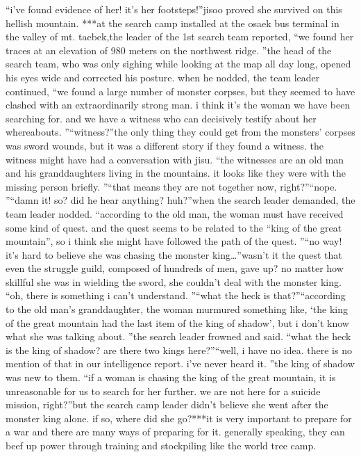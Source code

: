 “i’ve found evidence of her! it’s her footsteps!”jisoo proved she survived on this hellish mountain.
***at the search camp installed at the osaek bus terminal in the valley of mt.
 taebek,the leader of the 1st search team reported, “we found her traces at an elevation of 980 meters on the northwest ridge.
”the head of the search team, who was only sighing while looking at the map all day long, opened his eyes wide and corrected his posture.
when he nodded, the team leader continued, “we found a large number of monster corpses, but they seemed to have clashed with an extraordinarily strong man.
 i think it’s the woman we have been searching for.
 and we have a witness who can decisively testify about her whereabouts.
”“witness?”the only thing they could get from the monsters’ corpses was sword wounds, but it was a different story if they found a witness.
 the witness might have had a conversation with jisu.
“the witnesses are an old man and his granddaughters living in the mountains.
 it looks like they were with the missing person briefly.
”“that means they are not together now, right?”“nope.
”“damn it! so? did he hear anything? huh?”when the search leader demanded, the team leader nodded.
“according to the old man, the woman must have received some kind of quest.
 and the quest seems to be related to the “king of the great mountain”, so i think she might have followed the path of the quest.
”“no way! it’s hard to believe she was chasing the monster king…”wasn’t it the quest that even the struggle guild, composed of hundreds of men, gave up? no matter how skillful she was in wielding the sword, she couldn’t deal with the monster king.
“oh, there is something i can’t understand.
”“what the heck is that?”“according to the old man’s granddaughter, the woman murmured something like, ‘the king of the great mountain had the last item of the king of shadow’, but i don’t know what she was talking about.
”the search leader frowned and said.
 “what the heck is the king of shadow? are there two kings here?”“well, i have no idea.
 there is no mention of that in our intelligence report.
 i’ve never heard it.
”the king of shadow was new to them.
“if a woman is chasing the king of the great mountain, it is unreasonable for us to search for her further.
 we are not here for a suicide mission, right?”but the search camp leader didn’t believe she went after the monster king alone.
if so, where did she go?***it is very important to prepare for a war and there are many ways of preparing for it.
generally speaking, they can beef up power through training and stockpiling like the world tree camp.

